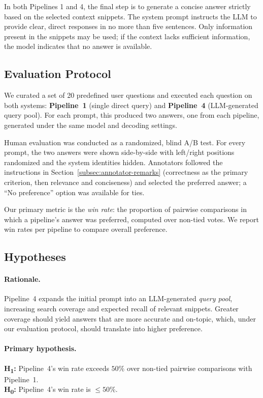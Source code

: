 \documentclass[manuscript,screen]{acmart}
\begin{document}
\begin{CCSXML}
		In both Pipelines 1 and 4, the final step is to generate a concise answer strictly based on the selected context snippets. The system prompt instructs the LLM to provide clear, direct responses in no more than five sentences. Only information present in the snippets may be used; if the context lacks sufficient information, the model indicates that no answer is available.
	
	
	\subsection{Evaluation Protocol}
	\label{subsec:evaluation-protocol}
	
	We curated a set of 20 predefined user questions and executed each question on
	both systems: \textbf{Pipeline~1} (single direct query) and \textbf{Pipeline~4}
	(LLM-generated query pool). For each prompt, this produced two answers, one from
	each pipeline, generated under the same model and decoding settings.
	
	Human evaluation was conducted as a randomized, blind A/B test. For every
	prompt, the two answers were shown side-by-side with left/right positions
	randomized and the system identities hidden. Annotators followed the instructions
	in Section~\ref{subsec:annotator-remarks} (correctness as the primary criterion,
	then relevance and conciseness) and selected the preferred answer; a “No
	preference” option was available for ties.
	
	Our primary metric is the \emph{win rate}: the proportion of pairwise
	comparisons in which a pipeline’s answer was preferred, computed over
	non-tied votes. We report win rates per pipeline to compare overall preference.

	
	\subsection{Hypotheses}
	\label{subsec:hypotheses}

	\paragraph{Rationale.}
	Pipeline~4 expands the initial prompt into an LLM-generated \emph{query pool}, increasing search coverage and expected recall of relevant snippets. Greater coverage should yield answers that are more accurate and on-topic, which, under our evaluation protocol, should translate into higher preference.
	
	\paragraph{Primary hypothesis.}
	\textbf{H\textsubscript{1}:} Pipeline~4’s win rate exceeds $50\%$ over non-tied pairwise comparisons with Pipeline~1.\\
	\textbf{H\textsubscript{0}:} Pipeline~4’s win rate is $\leq 50\%$.
	

\end{CCSXML}
\end{document}
